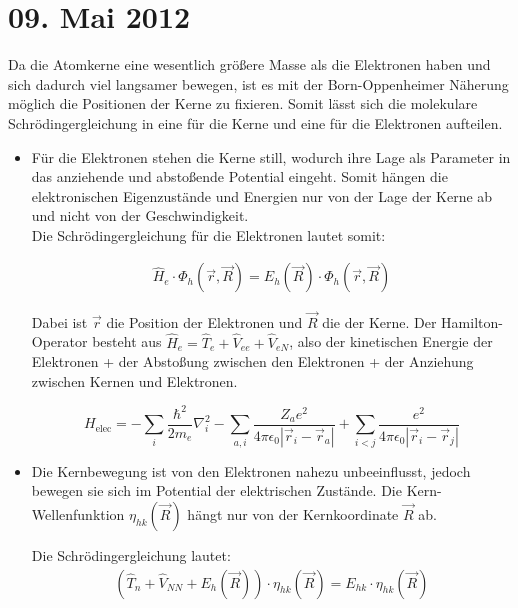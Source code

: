 \section{09. Mai 2012}

\label{q:21}

Da die Atomkerne eine wesentlich größere Masse als die Elektronen haben und sich dadurch viel langsamer bewegen, ist es mit der Born-Oppenheimer
Näherung möglich die Positionen der Kerne zu fixieren. Somit lässt sich die molekulare Schrödingergleichung in eine für die Kerne und eine
für die Elektronen aufteilen.

\begin{itemize}
    \item Für die Elektronen stehen die Kerne still, wodurch ihre Lage als Parameter in das anziehende und abstoßende Potential eingeht.
        Somit hängen die elektronischen Eigenzustände und Energien nur von der Lage der Kerne ab und nicht von der Geschwindigkeit.\\
            Die Schrödingergleichung für die Elektronen lautet somit:
            
        \begin{align}
            \hat{H}_e \cdot \Phi_h(\vec{r},\vec{R}) = E_h(\vec{R}) \cdot \Phi_h(\vec{r},\vec{R})
        \end{align}

        Dabei ist $\vec{r}$ die Position der Elektronen und $\vec{R}$ die der Kerne. Der Hamilton-Operator besteht aus $\hat{H}_e = \hat{T}_e + \hat{V}_{ee} + \hat{V}_{eN}$, 
        also der kinetischen Energie der Elektronen + der Abstoßung zwischen den Elektronen + der Anziehung zwischen Kernen und Elektronen.

        \begin{equation}
            \label{eq:electronic_hamiltonian}
            H_{\text{elec}} = - \sum_i \frac{\hbar^2}{2m_e} \nabla^2_i - \sum_{a,i} \frac{Z_a e^2}{4 \pi \epsilon_0 |\vec{r}_i-\vec{r}_a| }  + \sum_{i<j} \frac{e^2}{4 \pi \epsilon_0 |\vec{r}_i-\vec{r}_j| }
        \end{equation}

    \item Die Kernbewegung ist von den Elektronen nahezu unbeeinflusst, jedoch bewegen sie sich im Potential der elektrischen Zustände. 
        Die Kern-Wellenfunktion $\eta_{hk}(\vec{R})$ hängt nur von der Kernkoordinate $\vec{R}$ ab.

        Die Schrödingergleichung lautet:
        \begin{align}
            (\hat{T}_n + \hat{V}_{NN} + E_h(\vec{R})) \cdot \eta_{hk}(\vec{R}) = E_{hk} \cdot \eta_{hk}(\vec{R})
        \end{align}
\end{itemize}



